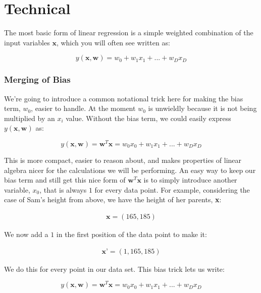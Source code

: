 \section{Technical}
The most basic form of linear regression is a simple weighted combination of the input variables $\textbf{x}$, which you will often see written as:

\begin{equation}
    y(\textbf{x}, \textbf{w}) = w_{0} + w_{1}x_{1} + ... + w_{D}x_{D}
\end{equation}

\subsubsection{Merging of Bias}
We're going to introduce a common notational trick here for making the bias term, $w_{0}$, easier to handle. At the moment $w_{0}$ is unwieldly because it is not being multiplied by an $x_{i}$ value. Without the bias term, we could easily express $y(\textbf{x}, \textbf{w})$ as:

\begin{equation}
    y(\textbf{x}, \textbf{w}) = \textbf{w}^{T}\textbf{x} = w_{0}x_{0} + w_{1}x_{1} + ... + w_{D}x_{D}
\end{equation}

 This is more compact, easier to reason about, and makes properties of linear algebra nicer for the calculations we will be performing. An easy way to keep our bias term and still get this nice form of $\textbf{w}^{T}\textbf{x}$ is to simply introduce another variable, $x_{0}$, that is always $1$ for every data point. For example, considering the case of Sam's height from above, we have the height of her parents, \textbf{x}:

\begin{align*}
    \textbf{x} = (165, 185)
\end{align*}

We now add a $1$ in the first position of the data point to make it:

\begin{align*}
    \textbf{x'} = (1, 165, 185)
\end{align*}

We do this for every point in our data set. This bias trick lets us write:

\begin{equation}
    y(\textbf{x}, \textbf{w}) = \textbf{w}^{T}\textbf{x} = w_{0}x_{0} + w_{1}x_{1} + ... + w_{D}x_{D}
\end{equation}

